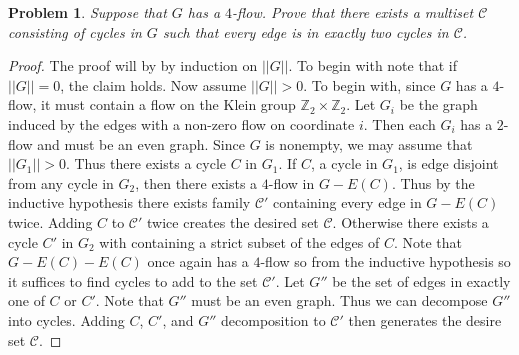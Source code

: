 \documentclass[12pt]{article}
\newtheorem{problem}{Problem}
\begin{document}
\begin{problem} Suppose that $G$ has a $4$-flow. Prove that there
  exists a multiset $\mathcal{C}$ consisting of cycles in $G$ such
  that every edge is in exactly two cycles in $\mathcal{C}$.
\end{problem}
\begin{proof} The proof will by by induction on $||G||$. To begin with
  note that if $||G|| = 0$, the claim holds. Now assume $||G|| >
  0$. To begin with, since $G$ has a $4$-flow, it must contain a flow
  on the Klein group $\mathbb{Z}_2\times \mathbb{Z}_2$. Let $G_i$ be
  the graph induced by the edges with a non-zero flow on coordinate
  $i$. Then each $G_i$ has a $2$-flow and must be an even graph. Since
  $G$ is nonempty, we may assume that $||G_1|| > 0$. Thus there exists
  a cycle $C$ in $G_1$. If $C$, a cycle in $G_1$, is edge disjoint
  from any cycle in $G_2$, then there exists a $4$-flow in $G -
  E(C)$. Thus by the inductive hypothesis there exists family
  $\mathcal{C}'$ containing every edge in $G-E(C)$ twice. Adding $C$
  to $\mathcal{C'}$ twice creates the desired set
  $\mathcal{C}$. Otherwise there exists a cycle $C'$ in $G_2$ with
  containing a strict subset of the edges of $C$. Note that
  $G - E(C) - E(C)$ once again has a $4$-flow so from the inductive
  hypothesis so it suffices to find cycles to add to the set
  $\mathcal{C}'$. Let $G''$ be the set of edges in exactly one of $C$
  or $C'$. Note that $G''$ must be an even graph. Thus we can
  decompose $G''$ into cycles. Adding $C$, $C'$, and $G''$
  decomposition to $\mathcal{C}'$ then generates the desire set
  $\mathcal{C}$.
\end{proof}
\end{document}
